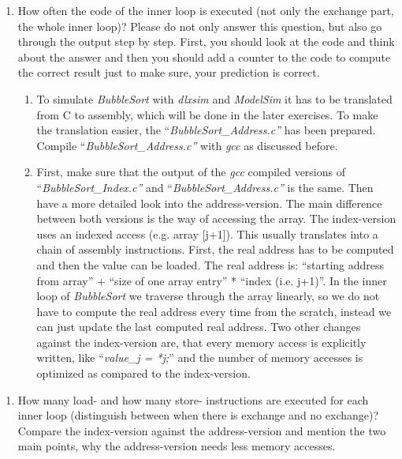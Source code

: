\documentclass[
]{article}
\begin{document}
\begin{enumerate}
\def\labelenumi{\alph{enumi})}
\item
  How often the code of the inner loop is executed (not only the
  exchange part, the whole inner loop)? Please do not only answer this
  question, but also go through the output step by step. First, you
  should look at the code and think about the answer and then you should
  add a counter to the code to compute the correct result just to make
  sure, your prediction is correct.

  \begin{enumerate}
  \def\labelenumii{\arabic{enumii}.}
  \item
    To simulate \emph{BubbleSort} with \emph{dlxsim} and \emph{ModelSim}
    it has to be translated from C to assembly, which will be done in
    the later exercises. To make the translation easier, the
    ``\emph{BubbleSort\_Address.c''} has been prepared. Compile
    ``\emph{BubbleSort\_Address.c''} with \emph{gcc} as discussed
    before.
  \item
    First, make sure that the output of the \emph{gcc} compiled versions
    of ``\emph{BubbleSort\_Index.c''} and
    ``\emph{BubbleSort\_Address.c''} is the same. Then have a more
    detailed look into the address-version. The main difference between
    both versions is the way of accessing the array. The index-version
    uses an indexed access (e.g. array {[}j+1{]}). This usually
    translates into a chain of assembly instructions. First, the real
    address has to be computed and then the value can be loaded. The
    real address is: ``starting address from array'' + ``size of one
    array entry'' * ``index (i.e. j+1)''. In the inner loop of
    \emph{BubbleSort} we traverse through the array linearly, so we do
    not have to compute the real address every time from the scratch,
    instead we can just update the last computed real address. Two other
    changes against the index-version are, that every memory access is
    explicitly written, like ``\emph{value\_j = *j;}'' and the number of
    memory accesses is optimized as compared to the index-version.
  \end{enumerate}
\end{enumerate}

\begin{enumerate}
\def\labelenumi{\alph{enumi})}
\item
  How many load- and how many store- instructions are executed for each
  inner loop (distinguish between when there is exchange and no
  exchange)? Compare the index-version against the address-version and
  mention the two main points, why the address-version needs less memory
  accesses.
\end{enumerate}
\end{document}
